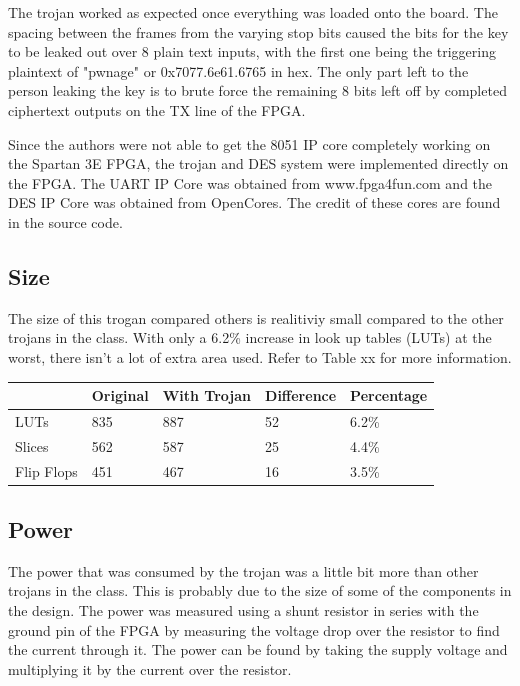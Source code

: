 \documentclass[letterpaper, 10 pt, conference]{ieeeconf}  %
\begin{document}
The trojan worked as expected once everything was loaded onto the board. The spacing between the frames from the varying stop bits caused the bits for the key to be leaked out over 8 plain text inputs, with the first one being the triggering plaintext of "pwnage" or 0x7077.6e61.6765 in hex. The only part left to the person leaking the key is to brute force the remaining 8 bits left off by completed ciphertext outputs on the TX line of the FPGA.

Since the authors were not able to get the 8051 IP core completely working on the Spartan 3E FPGA, the trojan and DES system were implemented directly on the FPGA.  The UART IP Core was obtained from www.fpga4fun.com and the DES IP Core was obtained from OpenCores.  The credit of these cores are found in the source code.

\subsection{Size}
 
The size of this trogan compared others is realitiviy small compared to the other trojans in the class. With only a 6.2\% increase in look up tables (LUTs) at the worst, there isn't a lot of extra area used. Refer to Table xx for more information.

 \begin{center}
    \begin{tabular}{| l | l | l | l | l |}
        \hline
        & Original & With Trojan & Difference & Percentage \\ \hline
        LUTs & 835 & 887 & 52 & 6.2\% \\ \hline
        Slices & 562 & 587 & 25 & 4.4\% \\ \hline
        Flip Flops & 451 & 467 & 16 & 3.5\% \\
        \hline
    \end{tabular}
\end{center}

\subsection{Power}

The power that was consumed by the trojan was a little bit more than other trojans in the class. This is probably due to the size of some of the components in the design. The power was measured using a shunt resistor in series with the ground pin of the FPGA by measuring the voltage drop over the resistor to find the current through it. The power can be found by taking the supply voltage and multiplying it by the current over the resistor.
\end{document}
